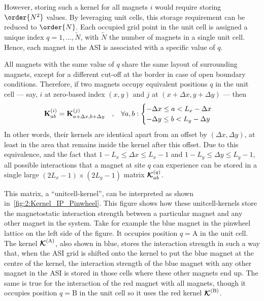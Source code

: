 However, storing such a kernel for all magnets $i$ would require storing $\order{N^2}$ values.
By leveraging unit cells, this storage requirement can be reduced to $\order{N}$.
Each occupied grid point in the unit cell is assigned a unique index $q = 1,\dots,\widetilde{N}$, with $\widetilde{N}$ the number of magnets in a single unit cell.
Hence, each magnet in the ASI is associated with a specific value of $q$. \par
All magnets with the same value of $q$ share the same layout of surrounding magnets, except for a different cut-off at the border in case of open boundary conditions.
Therefore, if two magnets occupy equivalent positions $q$ in the unit cell --- say, $i$ at zero-based index $(x,y)$ and $j$ at $(x+\Delta x, y+\Delta y)$ --- then
\begin{equation}
	\label{eq:2:Kernel_equivalence}
	\boldsymbol{\mathbf{K}}^{(i)}_{ab} = \boldsymbol{\mathbf{K}}^{(j)}_{a+\Delta x,b+\Delta y} \quad \mathrm{,} \quad \forall a,b:
	\begin{cases}
		-\Delta x \leq a < L_x - \Delta x \\
		-\Delta y \leq b < L_y - \Delta y \\
	\end{cases}
\end{equation}
In other words, their kernels are identical apart from an offset by $(\Delta x, \Delta y)$, at least in the area that remains inside the kernel after this offset.
Due to this equivalence, and the fact that $1 - L_x \leq \Delta x \leq L_x - 1$ and $1 - L_y \leq \Delta y \leq L_y - 1$, all possible interactions that a magnet at site $q$ can experience can be stored in a single large $(2L_x-1) \times (2L_y-1)$ matrix $\boldsymbol{\mathbf{\mathcal{K}}}^{(q)}_{ab}$. \\\par

This matrix, a ``unitcell-kernel'', can be interpreted as shown in~\cref{fig:2:Kernel_IP_Pinwheel}.
This figure shows how these unitcell-kernels store the magnetostatic interaction strength between a particular magnet and any other magnet in the system.
Take for example the blue magnet in the pinwheel lattice on the left side of the figure.
It occupies position $q=\mathrm{A}$ in the unit cell.
The kernel $\boldsymbol{\mathbf{\mathcal{K}}}^\mathrm{(A)}$, also shown in blue, stores the interaction strength in such a way that, when the ASI grid is shifted onto the kernel to put the blue magnet at the centre of the kernel, the interaction strength of the blue magnet with any other magnet in the ASI is stored in those cells where these other magnets end up.
The same is true for the interaction of the red magnet with all magnets, though it occupies position $q=\mathrm{B}$ in the unit cell so it uses the red kernel $\boldsymbol{\mathbf{\mathcal{K}}}^\mathrm{(B)}$.

